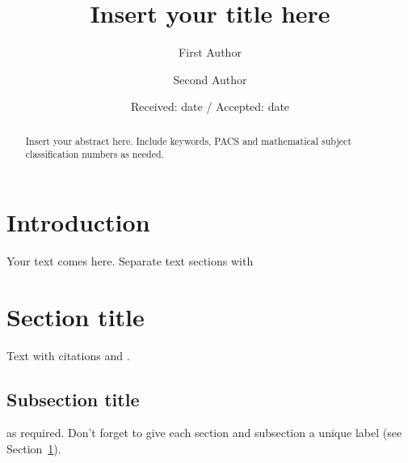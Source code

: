 \documentclass[smallextended]{svjour3}       %
\begin{document}
\title{Insert your title here
}

\author{First Author         \and
        Second Author %
}



\date{Received: date / Accepted: date}


\maketitle

\begin{abstract}
Insert your abstract here. Include keywords, PACS and mathematical
subject classification numbers as needed.
\end{abstract}

\section{Introduction}
\label{sec:1}
Your text comes here. Separate text sections with
\section{Section title}
\label{sec:2}
Text with citations \citep{Refa} and \citep{Refb}.
\subsection{Subsection title}
\label{sec:2.1}
as required. Don't forget to give each section
and subsection a unique label (see Section~\ref{sec:1}).
\end{document}

